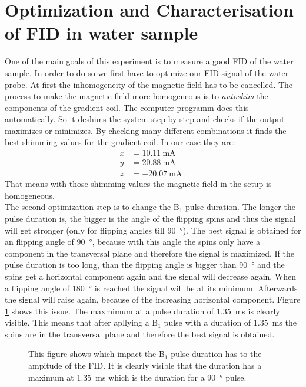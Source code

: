\section{Optimization and Characterisation of FID in water sample}
\label{sec:OptimizationandCharacterisationofFIDinwatersample}

One of the main goals of this experiment is to measure a good FID of the water sample. In order to do so we first have to optimize our FID signal of the water probe.\newline
At first the inhomogeneity of the magnetic field has to be cancelled. The process to make the magnetic field more homogeneous is to \textit{autoshim} the components of the gradient coil. The computer programm does this automatically. So it deshims the system step by step and checks if the output maximizes or minimizes. By checking many different combinations it finds the best shimming values for the gradient coil. In our case they are:
\begin{align*}
    x &= \SI{10.11}{\milli \ampere}\\
    y &= \SI{20.88}{\milli \ampere}\\
    z &= \SI{-20.07}{\milli \ampere} \ .
    \label{eq: shimmingvalues}
\end{align*}
That means with those shimming values the magnetic field in the setup is homogeneous.
\\
The second optimization step is to change the B$_1$ pulse duration. The longer the pulse duration is, the bigger is the angle of the flipping spins and thus the signal will get stronger (only for flipping angles till \SI{90}{\degree}). The best signal is obtained for an flipping angle of \SI{90}{\degree}, because with this angle the spins only have a component in the transversal plane and therefore the signal is maximized. If the pulse duration is too long, than the flipping angle is bigger than \SI{90}{\degree} and the spins get a horizontal component again and the signal will decrease again. When a flipping angle of \SI{180}{\degree} is reached the signal will be at its minimum. Afterwards the signal will raise again, because of the increasing horizontal component. Figure \ref{fig:B1dauer} shows this issue. The maxmimum at a pulse duration of \SI{1.35}{\milli \second} is clearly visible. This means that after apllying a B$_1$ pulse with a duration of \SI{1.35}{\milli \second} the spins are in the transversal plane and therefore the best signal is obtained.
\begin{figure}[H]
    \centering
    
    \caption[This figure shows which impact the B$_1$ pulse duration has to the ampitude of the FID.]{This figure shows which impact the B$_1$ pulse duration has to the ampitude of the FID. It is clearly visible that the duration has a maximum at \SI{1.35}{\milli \second} which is the duration for a \SI{90}{\degree} pulse.}
    \label{fig:B1dauer}
\end{figure}
